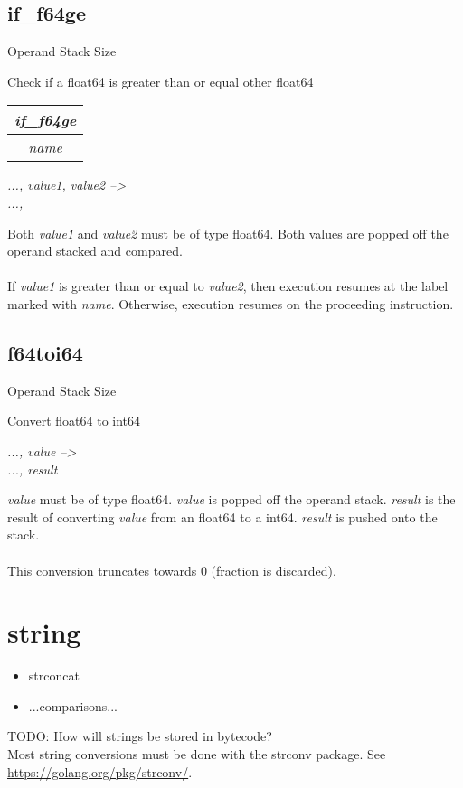 \documentclass[12pt]{article}
\begin{document}
		\subsection*{if\_f64ge}
			\begin{labeling}{Operand Stack Size}
				\item [\textbf{Operation}] Check if a float64 is greater than or equal other float64
				\item [\textbf{Format}] \begin{tabular}{| c |} \hline \textit{if\_f64ge} \\ \hline \textit{name} \\ \hline \end{tabular}
				\item [\textbf{Operand Stack}] \textit{..., value1, value2 --\textgreater} \\
										\textit{..., }
				\item [\textbf{Description}] Both \textit{value1} and \textit{value2} must be of type float64. Both values are popped off the operand stacked and compared. \\ \\
				If \textit{value1} is greater than or equal to \textit{value2}, then execution resumes at the label marked with \textit{name}. Otherwise, execution resumes on the proceeding instruction. 
			\end{labeling}	
		\newpage
		\subsection*{f64toi64}
			\begin{labeling}{Operand Stack Size}
				\item [\textbf{Operation}] Convert float64 to int64
				\item [\textbf{Format}] 
				\item [\textbf{Operand Stack}] \textit{..., value --\textgreater} \\
										\textit{..., result}
				\item [\textbf{Description}] \textit{value} must be of type float64. \textit{value} is popped off the operand stack. \textit{result} is the result of converting \textit{value} from an float64 to a int64. \textit{result} is pushed onto the stack. \\ \\
				This conversion truncates towards 0 (fraction is discarded).  
			\end{labeling}	
		\newpage
	
	\section{string}
		\begin{itemize}
			\item strconcat
			\item ...comparisons...
		\end{itemize}
		TODO: How will strings be stored in bytecode? \\
		Most string conversions must be done with the \colorbox{code}{strconv} package. See \url{https://golang.org/pkg/strconv/}.
	
\end{document}

